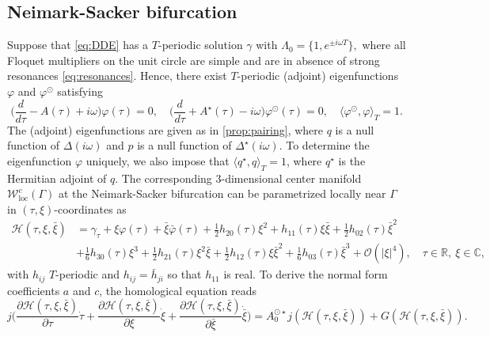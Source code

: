 \documentclass[english]{myarticle}
\DeclareMathOperator{\loc}{loc}
\begin{document}
\begin{sloppypar}
\subsection{Neimark-Sacker bifurcation} \label{subsec:NS}
Suppose that \eqref{eq:DDE} has a $T$-periodic solution $\gamma$ with $\Lambda_0 = \{ 1, e^{\pm i\omega T} \},$ where all Floquet multipliers on the unit circle are simple and are in absence of strong resonances \eqref{eq:resonances}. Hence, there exist $T$-periodic (adjoint) eigenfunctions $\varphi$ and $\varphi^\odot$ satisfying
\begin{equation*}
    \bigg(\frac{d}{d \tau} - A(\tau) + i \omega \bigg)\varphi(\tau) = 0, \quad \bigg(\frac{d}{d \tau} + A^\star(\tau) - i \omega \bigg)\varphi^\odot(\tau) = 0, \quad \langle \varphi^\odot, \varphi \rangle_T = 1.
\end{equation*}
The (adjoint) eigenfunctions are given as in \cref{prop:pairing}, where $q$ is a null function of $\Delta(i \omega)$ and $p$ is a null function of $\Delta^\star(i \omega).$ To determine the eigenfunction $\varphi$ uniquely, we also impose that $\langle q^\star, q \rangle_T = 1$, where $q^\star$ is the Hermitian adjoint of $q$. The corresponding 3-dimensional center manifold $\mathcal{W}_{\loc}^{c}(\Gamma)$ at the Neimark-Sacker bifurcation can be parametrized locally near $\Gamma$ in $(\tau,\xi)$-coordinates as
\begin{align*}
    \mathcal{H}(\tau,\xi,\bar{\xi}) &= \gamma_\tau + \xi \varphi(\tau) + \bar{\xi}\bar{\varphi}(\tau)
     + \frac{1}{2}h_{20}(\tau)\xi^2 + h_{11}(\tau) \xi \bar{\xi} + \frac{1}{2} h_{02}(\tau)\bar{\xi}^2 \\
     & +\frac{1}{6}h_{30}(\tau)\xi^3 + \frac{1}{2} h_{21}(\tau) \xi^2 \bar{\xi} +  \frac{1}{2}h_{12}(\tau) \xi \bar{\xi}^2  + \frac{1}{6} h_{03}(\tau) \bar{\xi}^3 + \mathcal{O}(|\xi|^4), \quad \tau \in \mathbb{R}, \ \xi \in \mathbb{C},
\end{align*}
with $h_{ij}$ $T$-periodic and $h_{ij} = \bar{h}_{ji}$ so that $h_{11}$ is real. To derive the normal form coefficients $a$ and $c$, the homological equation reads
\begin{equation*}
        j\bigg(\frac{\partial \mathcal{H}(\tau,\xi,\bar{\xi})}{\partial \tau} \dot{\tau} + \frac{\partial \mathcal{H}(\tau,\xi,\bar{\xi})}{\partial \xi} \dot{\xi} + \frac{\partial \mathcal{H}(\tau,\xi,\bar{\xi})}{\partial \bar{\xi}} \dot{\bar{\xi}} \bigg) = A_{0}^{\odot \star}j(\mathcal{H}(\tau,\xi,\bar{\xi})) + G(\mathcal{H}(\tau,\xi,\bar{\xi})).
\end{equation*}

\end{sloppypar}
\end{document}
